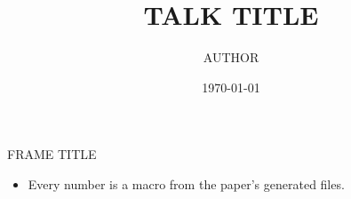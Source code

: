 \documentclass[aspectratio=169,11pt]{beamer}
\title{TALK TITLE}
\author{AUTHOR}
\date{\today}
\begin{document}
\begin{frame}
  \titlepage
\end{frame}

\begin{frame}{FRAME TITLE}
  \begin{itemize}
    \item Every number is a macro from the paper's generated files.
  \end{itemize}
\end{frame}
\end{document}
